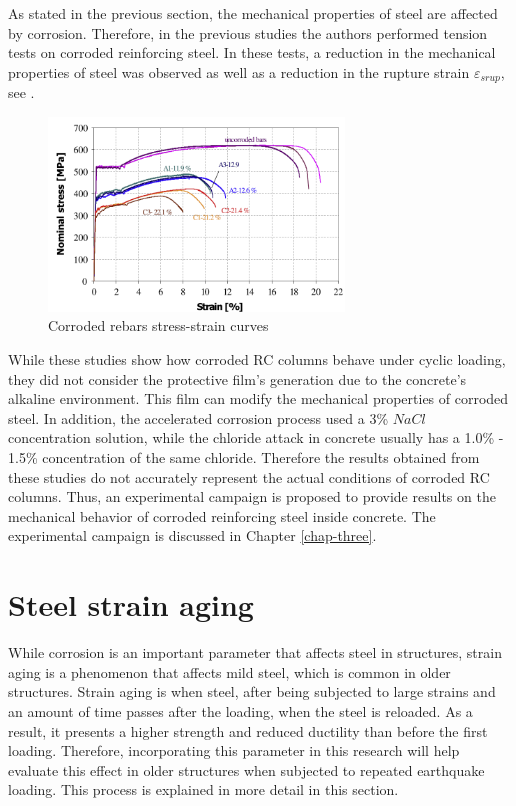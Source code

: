 As stated in the previous section, the mechanical properties of steel are affected by corrosion. Therefore, in the previous studies \cite{Meda2014} the authors performed tension tests on corroded reinforcing steel. In these tests, a reduction in the mechanical properties of steel was observed as well as a reduction in the rupture strain $\varepsilon_{srup}$, see . 

\begin{figure}[htbp]
	\centering
	\includegraphics[width=0.7\textwidth]{Chapter-3/figs/Meda_StressStrain}
	\caption{Corroded rebars stress-strain curves \cite{Meda2014}}
	\label{fig:Meda_RebarTest}
\end{figure}

While these studies show how corroded RC columns behave under cyclic loading, they did not consider the protective film's generation due to the concrete's alkaline environment. This film can modify the mechanical properties of corroded steel. In addition, the accelerated corrosion process used a 3\% $NaCl$ concentration solution, while the chloride attack in concrete usually has a 1.0\% - 1.5\% concentration of the same chloride. Therefore the results obtained from these studies do not accurately represent the actual conditions of corroded RC columns. Thus, an experimental campaign is proposed to provide results on the mechanical behavior of corroded reinforcing steel inside concrete. The experimental campaign is discussed in Chapter \ref{chap-three}.

\section{Steel strain aging}

While corrosion is an important parameter that affects steel in structures, strain aging is a phenomenon that affects mild steel, which is common in older structures. Strain aging is when steel, after being subjected to large strains and an amount of time passes after the loading, when the steel is reloaded. As a result, it presents a higher strength and reduced ductility than before the first loading. Therefore, incorporating this parameter in this research will help evaluate this effect in older structures when subjected to repeated earthquake loading. This process is explained in more detail in this section.

